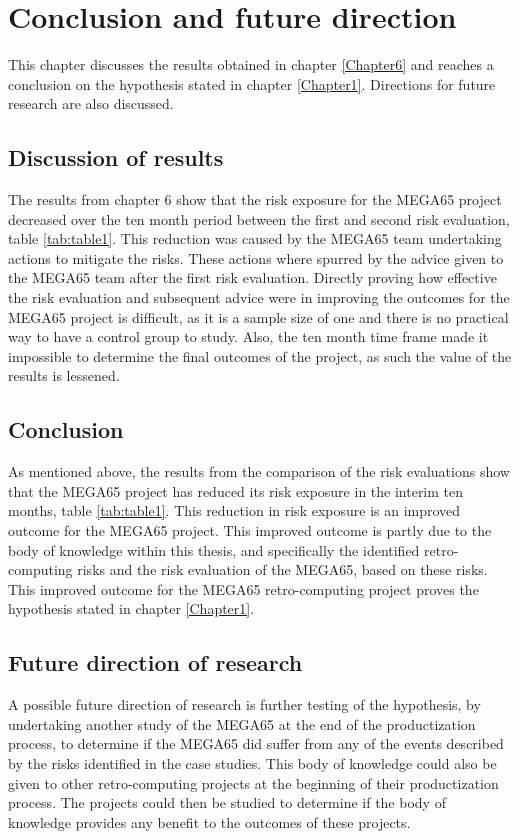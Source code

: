 
\chapter{Conclusion and future direction}
\label{Chapter7}
This chapter discusses the results obtained in chapter \ref{Chapter6} and reaches a conclusion on the hypothesis stated in chapter \ref{Chapter1}. Directions for future research are also discussed.

\section{Discussion of results}
The results from chapter 6 show that the risk exposure for the MEGA65 project decreased over the ten month period between the first and second risk evaluation, table \ref{tab:table1}. This reduction was caused by the MEGA65 team undertaking actions to mitigate the risks. These actions where spurred by the advice given to the MEGA65 team after the first risk evaluation. Directly proving how effective the risk evaluation and subsequent advice were in improving the outcomes for the MEGA65 project is difficult, as it is a sample size of one and there is no practical way to have a control group to study. Also, the ten month time frame made it impossible to determine the final outcomes of the project, as such the value of the results is lessened.

\section{Conclusion}
As mentioned above, the results from the comparison of the risk evaluations show that the MEGA65 project has reduced its risk exposure in the interim ten months, table \ref{tab:table1}. This reduction in risk exposure is an improved outcome for the MEGA65 project. This improved outcome is partly due to the body of knowledge within this thesis, and specifically the identified retro-computing risks and the risk evaluation of the MEGA65, based on these risks. This improved outcome for the MEGA65 retro-computing project proves the hypothesis stated in chapter \ref{Chapter1}.

\section{Future direction of research}
A possible future direction of research is further testing of the hypothesis, by undertaking another study of the MEGA65 at the end of the productization process, to determine if the MEGA65 did suffer from any of the events described by the risks identified in the case studies. This body of knowledge could also be given to other retro-computing projects at the beginning of their productization process. The projects could then be studied to determine if the body of knowledge provides any benefit to the outcomes of these projects.

